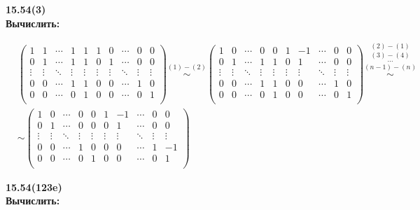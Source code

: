 \documentclass[a4paper,12pt]{article} %
\begin{document}
\noindent\textbf{15.54(3)\\Вычислить:}

\begin{align*}
	&\left(
		\begin{array}{ccccc|ccccc}
		1&1&\cdots&1&1					&1&0&\cdots&0&0\\
		0&1&\cdots&1&1    				&0&1&\cdots&0&0\\
		\vdots&\vdots&\ddots&\vdots&\vdots&\vdots
		&\vdots&\ddots&\vdots&\vdots\\
		0&0&\cdots&1&1     				&0&0&\cdots&1&0\\
		0&0&\cdots&0&1 					&0&0&\cdots&0&1\\
		\end{array}
	\right)
	\stackrel{(1)-(2)}{\sim}
	\left(
		\begin{array}{ccccc|ccccc}
		1&0&\cdots&0&0					&1&-1&\cdots&0&0\\
		0&1&\cdots&1&1    				&0&1&\cdots&0&0\\
		\vdots&\vdots&\ddots&\vdots&\vdots&\vdots
		&\vdots&\ddots&\vdots&\vdots\\
		0&0&\cdots&1&1     				&0&0&\cdots&1&0\\
		0&0&\cdots&0&1 					&0&0&\cdots&0&1\\
		\end{array}
	\right)
	\stackrel{(2)-(1)}{\stackrel{(3)-(4)}{\stackrel{\cdots}{\stackrel{(n-1)-(n)}{\sim}}}}\\
	&\sim\left(
	\begin{array}{ccccc|ccccc}
	1&0&\cdots&0&0					&1&-1&\cdots&0&0\\
	0&1&\cdots&0&0    				&0&1&\cdots&0&0\\
	\vdots&\vdots&\ddots&\vdots&\vdots&\vdots
	&\vdots&\ddots&\vdots&\vdots\\
	0&0&\cdots&1&0     				&0&0&\cdots&1&-1\\
	0&0&\cdots&0&1 					&0&0&\cdots&0&1\\
	\end{array}
	\right)
\end{align*}

\noindent\textbf{15.54(123e)\\Вычислить:}
\end{document}
